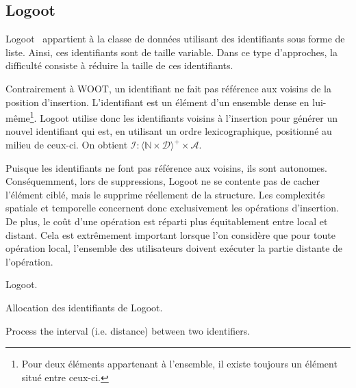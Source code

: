 
\subsection{Logoot}

Logoot~\cite{weiss2009logoot} appartient à la classe de données utilisant des
identifiants sous forme de liste. Ainsi, ces identifiants sont de taille
variable. Dans ce type d'approches, la difficulté consiste à réduire la taille
de ces identifiants.

Contrairement à WOOT, un identifiant ne fait pas référence aux voisins de la
position d'insertion. L'identifiant est un élément d'un ensemble dense en
lui-même\footnote{Pour deux éléments appartenant à l'ensemble, il existe
  toujours un élément situé entre ceux-ci.}. Logoot utilise donc les
identifiants voisins à l'insertion pour générer un nouvel identifiant qui est,
en utilisant un ordre lexicographique, positionné au milieu de ceux-ci. On
obtient
$\mathcal{I}: \langle \mathbb{N} \times \mathcal{D}\rangle^{+} \times
\mathcal{A}$.

Puisque les identifiants ne font pas référence aux voisins, ils sont
autonomes. Conséquemment, lors de suppressions, Logoot ne se contente pas de
cacher l'élément ciblé, mais le supprime réellement de la structure. Les
complexités spatiale et temporelle concernent donc exclusivement les opérations
d'insertion. De plus, le coût d'une opération est réparti plus équitablement
entre local et distant. Cela est extrêmement important lorsque l'on considère
que pour toute opération local, l'ensemble des utilisateurs doivent exécuter la
partie distante de l'opération.

\begin{algorithm}
  
  \caption{\label{algo:logoot}Logoot.}
\end{algorithm}

\begin{algorithm}
  
  \caption{\label{algo:logootalloc}Allocation des identifiants de Logoot.}
\end{algorithm}

\begin{algorithm}
  
  \caption{\label{algo:logootinterval}Process the interval (i.e. distance)
    between two identifiers.}
\end{algorithm}

